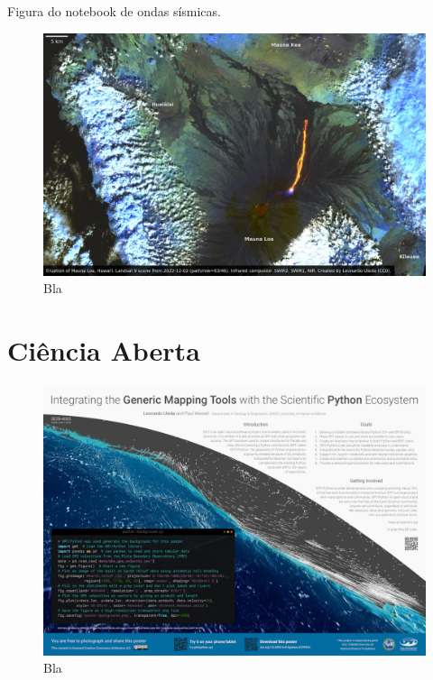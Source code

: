 \documentclass[11pt,a4paper,oneside]{book}
\begin{document}
Figura do notebook de ondas sísmicas.

\begin{figure}[h]
  \vspace{0.5cm}
  \begin{center}
    \includegraphics[width=\textwidth]{images/mauna-loa-landsat-2022-12-02.jpg}
  \end{center}
  \caption{
    Bla
  }
\end{figure}

\chapter{Ciência Aberta}


\begin{figure}[h]
  \vspace{0.5cm}
  \begin{center}
    \includegraphics[width=\textwidth]{images/aogs2018.jpg}
  \end{center}
  \caption{
    Bla
  }
\end{figure}
\end{document}
